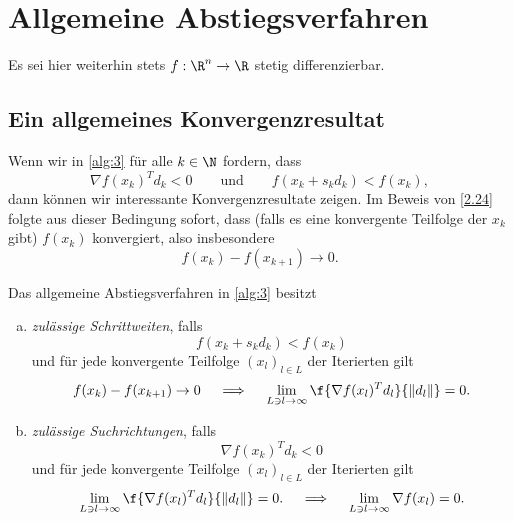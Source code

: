 \section{Allgemeine Abstiegsverfahren}


Es sei hier weiterhin stets $f: \R^n \to \R$ stetig differenzierbar.

\begin{alg} \label{alg:3}
	\begin{algorithmic}

		\EndWhile
	\end{algorithmic}
\end{alg}

\subsection{Ein allgemeines Konvergenzresultat}

Wenn wir in \ref{alg:3} für alle $k \in \N$ fordern, dass
\[
	\nabla f(x_k)^T d_k < 0
	\qquad\text{und}\qquad
	f(x_k + s_k d_k) < f(x_k),
\]
dann können wir interessante Konvergenzresultate zeigen.
Im Beweis von \ref{2.24} folgte aus dieser Bedingung sofort, dass (falls es eine konvergente Teilfolge der $x_k$ gibt) $f(x_k)$ konvergiert, also insbesondere
\[
	f(x_k) - f(x_{k+1}) \to 0.
\]

\begin{df} \label{2.28}
	Das allgemeine Abstiegsverfahren in \ref{alg:3} besitzt
	\begin{enumerate}[(a)]
		\item
			\emph{zulässige Schrittweiten}, falls
			\[
				f(x_k + s_k d_k) < f(x_k)
			\]
			und für jede konvergente Teilfolge $(x_l)_{l\in L}$ der Iterierten gilt
			\[
				f(x_k) - f(x_{k+1}) \to 0
				\quad\implies\quad
				\lim_{L \ni l \to \infty} \f{\nabla f(x_l)^T d_l}{\|d_l\|} = 0.
			\]
		\item
			\emph{zulässige Suchrichtungen}, falls
			\[
				\nabla f(x_k)^T d_k < 0
			\]
			und für jede konvergente Teilfolge $(x_l)_{l\in L}$ der Iterierten gilt
			\[
				\lim_{L \ni l \to \infty} \f{\nabla f(x_l)^T d_l}{\|d_l\|} = 0.
				\quad\implies\quad
				\lim_{L \ni l \to \infty} \nabla f(x_l) = 0.
			\]
	\end{enumerate}
\end{df}

